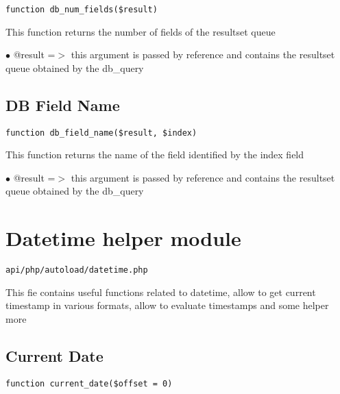 \documentclass[a4paper]{book}
\begin{document}
\begin{lstlisting}
function db_num_fields($result)
\end{lstlisting}

This function returns the number of fields of the resultset queue

\begin{compactitem}
\item[\color{myblue}$\bullet$] @result =$>$ this argument is passed by reference and contains the resultset queue
           obtained by the db\_query
\end{compactitem}

\hypertarget{toc72}{}
\subsection{DB Field Name}

\begin{lstlisting}
function db_field_name($result, $index)
\end{lstlisting}

This function returns the name of the field identified by the index field

\begin{compactitem}
\item[\color{myblue}$\bullet$] @result =$>$ this argument is passed by reference and contains the resultset queue
           obtained by the db\_query
\end{compactitem}

\hypertarget{toc73}{}
\section{Datetime helper module}

\begin{lstlisting}
api/php/autoload/datetime.php
\end{lstlisting}

This fie contains useful functions related to datetime, allow to get current timestamp in various
formats, allow to evaluate timestamps and some helper more

\hypertarget{toc74}{}
\subsection{Current Date}

\begin{lstlisting}
function current_date($offset = 0)
\end{lstlisting}
\end{document}
